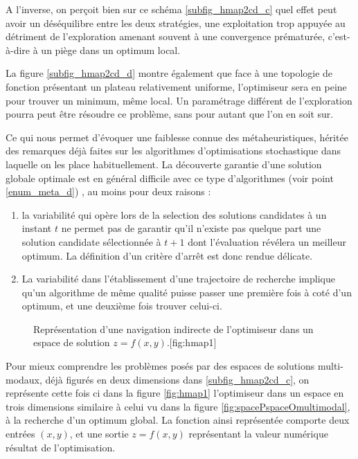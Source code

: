A l'inverse, on perçoit bien sur ce schéma \ref{subfig_hmap2cd_c} quel effet peut avoir un déséquilibre entre les deux stratégies, une exploitation trop appuyée au détriment de l'exploration amenant souvent à une convergence  prématurée, c'est-à-dire à un piège dans un optimum local.

La figure \ref{subfig_hmap2cd_d} montre également que face à une topologie de fonction présentant un plateau relativement uniforme, l'optimiseur sera en peine pour trouver un minimum, même local. Un paramétrage différent de l'exploration pourra peut être résoudre ce problème, sans pour autant que l'on en soit sur.

Ce qui nous permet d'évoquer une faiblesse connue des métaheuristiques, héritée des remarques déjà faites sur les algorithmes d'optimisations stochastique  dans laquelle on les place habituellement. La découverte garantie d'une solution globale optimale est en général difficile avec ce type d'algorithmes (voir point \ref{enum_meta_d}) , au moins pour deux raisons :

\begin{enumerate}
\item la variabilité qui opère lors de la selection des solutions candidates à un instant $t$ ne permet pas de garantir qu'il n'existe pas quelque part une solution candidate sélectionnée à $t+1$ dont l'évaluation révélera un meilleur optimum. La définition d'un critère d'arrêt est donc rendue délicate.
\item La variabilité dans l'établissement d'une trajectoire de recherche implique qu'un algorithme de même qualité puisse passer une première fois à coté d'un optimum, et une deuxième fois trouver celui-ci.
\end{enumerate}

\begin{figure}[!htbp]
\begin{sidecaption}[fortoc]{Représentation d'une navigation indirecte de l'optimiseur dans un espace de solution $z = f(x,y)$.}[fig:hmap1]
  \centering
  \qquad
\end{sidecaption}
\end{figure}

Pour mieux comprendre les problèmes posés par des espaces de solutions multi-modaux, déjà figurés en deux dimensions dans \ref{subfig_hmap2cd_c}, on représente cette fois ci dans la figure \ref{fig:hmap1} l'optimiseur dans un espace en trois dimensions similaire à celui vu dans la figure \ref{fig:spacePspaceOmultimodal}, à la recherche d'un optimum global. La fonction ainsi représentée comporte deux entrées $(x,y)$, et une sortie $z = f(x,y)$ représentant la valeur numérique résultat de l'optimisation.

